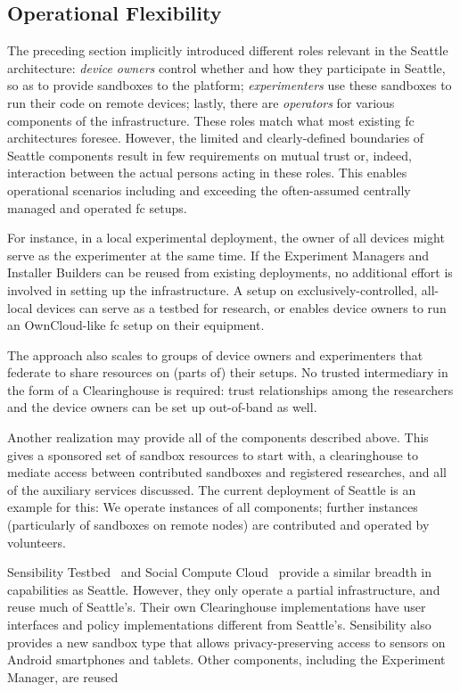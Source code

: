 \subsection{Operational Flexibility}\label{sec-op-flex}

The preceding section implicitly introduced different roles relevant
in the Seattle architecture:
\textit{device owners} control whether and how they participate
in Seattle, so as to provide sandboxes to the platform;
\textit{experimenters} use these sandboxes to run their code
on remote devices;
lastly, there are \textit{operators} for various components
of the infrastructure.
These roles match what most existing \gls{fc} architectures
foresee.
However, the limited and clearly-defined boundaries of Seattle
components result in few requirements on mutual trust or, indeed,
interaction between
the actual persons acting in these roles. This enables operational
scenarios including and exceeding the often-assumed centrally managed
and operated \gls{fc} setups.

For instance, in a local experimental deployment, the owner of all
devices might serve as the experimenter at the same time. If
the Experiment Managers and Installer Builders can be reused
from existing deployments, no additional effort is involved in
setting up the infrastructure.
A setup on exclusively-controlled, all-local devices can serve as
a testbed for research, or enables device owners to run an
OwnCloud-like \gls{fc} setup on their equipment.

The approach also scales to groups of device owners and experimenters
that federate
to share resources on (parts of) their setups. No trusted
intermediary in the form of a Clearinghouse is required:
trust relationships among the researchers and the device owners
can be set up out-of-band as well.

Another realization may provide all of the components described above.
This gives a sponsored set of sandbox resources to start with,
a clearinghouse to mediate access between contributed sandboxes
and registered researches, and all of the auxiliary services
discussed. The current deployment of Seattle is an example for
this: We operate instances of all components; further instances
(particularly of sandboxes on remote nodes) are contributed and
operated by volunteers.

Sensibility Testbed~\cite{zhuang2014sensibility} and Social Compute
Cloud~\cite{caton2014social} provide a similar breadth in capabilities
as Seattle. However, they only operate a partial infrastructure, and
reuse much of Seattle's. Their own Clearinghouse
implementations have user interfaces and policy implementations
different from Seattle's. Sensibility also provides a new sandbox
type that allows privacy-preserving access to sensors on Android
smartphones and tablets. Other components, including the Experiment
Manager, are reused

